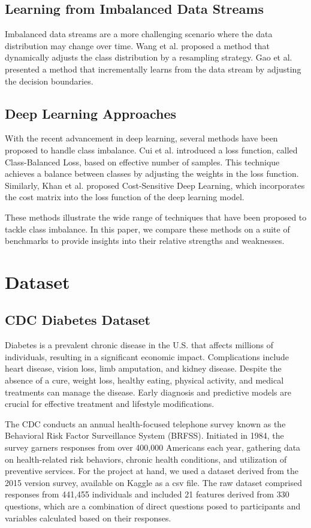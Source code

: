 \documentclass[journal]{IEEEtran}
\begin{document}
\subsection{Learning from Imbalanced Data Streams} 
Imbalanced data streams are a more challenging scenario where the data distribution may change over time. Wang et al. \cite{wang2018} proposed a method that dynamically adjusts the class distribution by a resampling strategy. Gao et al. \cite{gao2015} presented a method that incrementally learns from the data stream by adjusting the decision boundaries.

\subsection{Deep Learning Approaches}
With the recent advancement in deep learning, several methods have been proposed to handle class imbalance. Cui et al. \cite{cui2019} introduced a loss function, called Class-Balanced Loss, based on effective number of samples. This technique achieves a balance between classes by adjusting the weights in the loss function. Similarly, Khan et al. \cite{khan2017} proposed Cost-Sensitive Deep Learning, which incorporates the cost matrix into the loss function of the deep learning model.

These methods illustrate the wide range of techniques that have been proposed to tackle class imbalance. In this paper, we compare these methods on a suite of benchmarks to provide insights into their relative strengths and weaknesses.
	
	
	\section{Dataset}
	\label{sec:dataset}
	
	\subsection{CDC Diabetes Dataset}
	\cite{cdc2022}
	Diabetes is a prevalent chronic disease in the U.S. that affects millions of individuals, resulting in a significant economic impact. Complications include heart disease, vision loss, limb amputation, and kidney disease. Despite the absence of a cure, weight loss, healthy eating, physical activity, and medical treatments can manage the disease. Early diagnosis and predictive models are crucial for effective treatment and lifestyle modifications.
	
	The CDC conducts an annual health-focused telephone survey known as the Behavioral Risk Factor Surveillance System (BRFSS). Initiated in 1984, the survey garners responses from over 400,000 Americans each year, gathering data on health-related risk behaviors, chronic health conditions, and utilization of preventive services. For the project at hand, we used a dataset derived from the 2015 version survey, available on Kaggle as a csv file. The raw dataset comprised responses from 441,455 individuals and included 21 features derived from 330 questions, which are a combination of direct questions posed to participants and variables calculated based on their responses.
\end{document}

